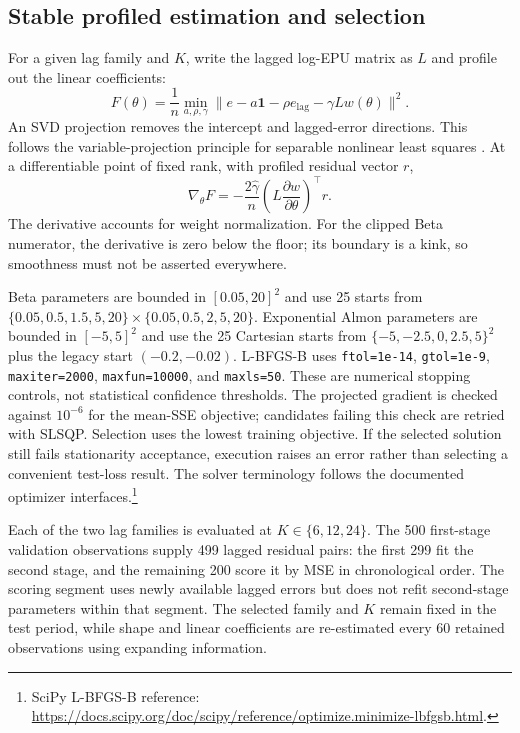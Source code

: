 \subsection{Stable profiled estimation and selection}
For a given lag family and $K$, write the lagged log-EPU matrix as $L$ and profile out the linear coefficients:
\begin{equation}
F(\theta)=\frac1n\min_{a,\rho,\gamma}
\|e-a\mathbf1-\rho e_{\mathrm{lag}}-\gamma Lw(\theta)\|^2.
\end{equation}
An SVD projection removes the intercept and lagged-error directions. This follows the variable-projection principle for separable nonlinear least squares \citep{GolubPereyra1973}. At a differentiable point of fixed rank, with profiled residual vector $r$,
\begin{equation}
\nabla_\theta F=-\frac{2\widehat\gamma}{n}
\left(L\frac{\partial w}{\partial\theta}\right)^{\!\top}r.
\end{equation}
The derivative accounts for weight normalization. For the clipped Beta numerator, the derivative is zero below the floor; its boundary is a kink, so smoothness must not be asserted everywhere.

Beta parameters are bounded in $[0.05,20]^2$ and use 25 starts from $\{0.05,0.5,1.5,5,20\}\times\{0.05,0.5,2,5,20\}$. Exponential Almon parameters are bounded in $[-5,5]^2$ and use the 25 Cartesian starts from $\{-5,-2.5,0,2.5,5\}^2$ plus the legacy start $(-0.2,-0.02)$. L-BFGS-B uses \texttt{ftol=1e-14}, \texttt{gtol=1e-9}, \texttt{maxiter=2000}, \texttt{maxfun=10000}, and \texttt{maxls=50}. These are numerical stopping controls, not statistical confidence thresholds. The projected gradient is checked against $10^{-6}$ for the mean-SSE objective; candidates failing this check are retried with SLSQP. Selection uses the lowest training objective. If the selected solution still fails stationarity acceptance, execution raises an error rather than selecting a convenient test-loss result. The solver terminology follows the documented optimizer interfaces.\footnote{SciPy L-BFGS-B reference: \url{https://docs.scipy.org/doc/scipy/reference/optimize.minimize-lbfgsb.html}.}

Each of the two lag families is evaluated at $K\in\{6,12,24\}$. The 500 first-stage validation observations supply 499 lagged residual pairs: the first 299 fit the second stage, and the remaining 200 score it by MSE in chronological order. The scoring segment uses newly available lagged errors but does not refit second-stage parameters within that segment. The selected family and $K$ remain fixed in the test period, while shape and linear coefficients are re-estimated every 60 retained observations using expanding information.

